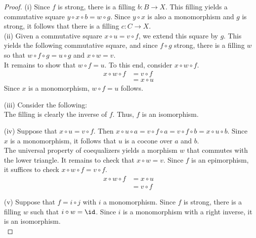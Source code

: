 \documentclass{amsart}
\begin{document}
\begin{proof}
  (i) Since $f$ is strong, there is a filling $b : B \to X$.
  This filling yields a commutative square $y \circ x \circ b = w \circ g$.
  Since $y \circ x$ is also a monomorphism and $g$ is strong, it follows that there is a filling $c : C \to X$.
  \[\]
  (ii) Given a commutative square $x \circ u = v \circ f$, we extend this square by $g$.
  This yields the following commutative square, and since $f \circ g$ strong, there is a filling $w$ so that $w \circ f \circ g = u \circ g$ and $x \circ w = v$.
  \[\]
  It remains to show that $w \circ f = u$.
  To this end, consider $x \circ w \circ f$.
  \begin{align}
    x \circ w \circ f &= v \circ f\\
              &= x \circ u
  \end{align}
  Since $x$ is a monomorphism, $w \circ f = u$ follows.

  (iii) Consider the following:
  \[\]
  The filling is clearly the inverse of $f$.
  Thus, $f$ is an isomorphism.

  (iv) Suppose that $x \circ u = v \circ f$.
  Then $x \circ u \circ a = v \circ f \circ a = v \circ f \circ b = x \circ u \circ b$.
  Since $x$ is a monomorphism, it follows that $u$ is a cocone over $a$ and $b$.
  \[\]
  The universal property of coequalizers yields a morphism $w$ that commutes with the lower triangle.
  It remains to check that $x \circ w = v$.
  Since $f$ is an epimorphism, it suffices to check $x \circ w \circ f = v \circ f$.
  \begin{align}
    x \circ w \circ f &= x \circ u\\
              &= v \circ f
  \end{align}

  (v) Suppose that $f = i \circ j$ with $i$ a monomorphism.
  Since $f$ is strong, there is a filling $w$ such that $i \circ w = \id$.
  Since $i$ is a monomorphism with a right inverse, it is an isomorphism.
  \[\]
\end{proof}
\end{document}
